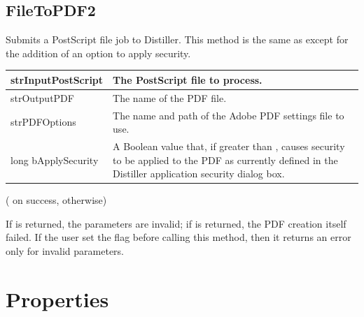 \documentclass[letterpaper,12pt,english,openany,oneside]{sphinxmanual}
\begin{document}
\subsection{FileToPDF2}
\label{\detokenize{Distiller_AutomationIntro:filetopdf2}}
Submits a PostScript file job to Distiller. This method is the same as  except for the addition of an option to apply security.

\label{\detokenize{Distiller_AutomationIntro:parameters-1}}


\begin{savenotes}\sphinxattablestart
\centering
{}\label{\detokenize{Distiller_AutomationIntro:section-1}}\nobreak
\begin{tabulary}{\linewidth}[t]{|T|T|}
\hline

strInputPostScript
&
The PostScript file to process.
\\
\hline
strOutputPDF
&
The name of the PDF file.
\\
\hline
strPDFOptions
&
The name and path of the Adobe PDF settings file to use.
\\
\hline
long bApplySecurity
&
A Boolean value that, if greater than  , causes security to be applied to the PDF as currently defined in the Distiller application security dialog box.
\\
\hline
\end{tabulary}
\par
\sphinxattableend\end{savenotes}


 ( on success,  otherwise)

If  is returned, the parameters are invalid; if  is returned, the PDF creation itself failed. If the user set the  flag before calling this method, then it returns an error only for invalid parameters.




\section{Properties}
\label{\detokenize{Distiller_AutomationIntro:properties}}
\end{document}
